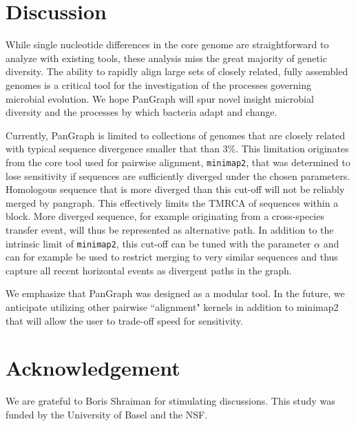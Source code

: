 \documentclass[aps,rmp,reprint,superscriptaddress,notitlepage,10pt]{revtex4-1}
\begin{document}
\section{Discussion}
While single nucleotide differences in the core genome are straightforward to analyze with existing tools, these analysis miss the great majority of genetic diversity. 
The ability to rapidly align large sets of closely related, fully assembled genomes is a critical tool for the investigation of the processes governing microbial evolution.
We hope PanGraph will spur novel insight microbial diversity and the processes by which bacteria adapt and change. 

Currently, PanGraph is limited to collections of genomes that are closely related with typical sequence divergence smaller that than 3\%. 
This limitation originates from the core tool used for pairwise alignment, \texttt{minimap2}, that was determined to lose sensitivity if sequences are sufficiently diverged under the chosen parameters.
Homologous sequence that is more diverged than this cut-off will not be reliably merged by pangraph.
This effectively limits the TMRCA of sequences within a block. 
More diverged sequence, for example originating from a cross-species transfer event, will thus be represented as alternative path.
In addition to the intrinsic limit of \texttt{minimap2}, this cut-off can be tuned with the parameter $\alpha$ and can for example be used to restrict merging to very similar sequences and thus capture all recent horizontal events as divergent paths in the graph.

We emphasize that PanGraph was designed as a modular tool.
In the future, we anticipate utilizing other pairwise ``alignment" kernels in addition to minimap2 that will allow the user to trade-off speed for sensitivity.

\section*{Acknowledgement}
We are grateful to Boris Shraiman for stimulating discussions.
This study was funded by the University of Basel and the NSF.

{}
\end{document}
